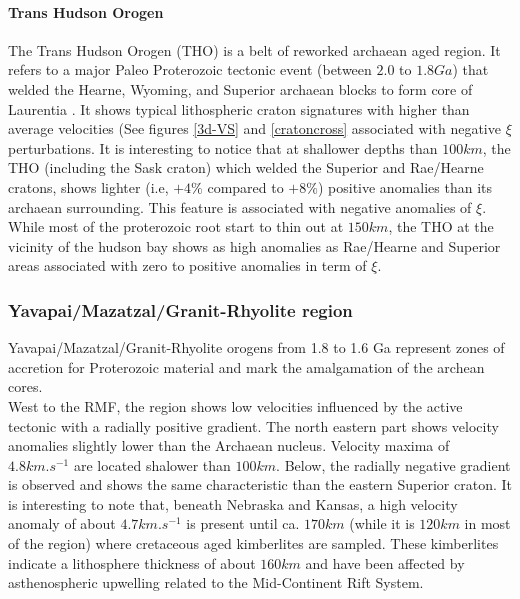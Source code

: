 \documentclass[12pt]{article}
\begin{document}
		\paragraph{Trans Hudson Orogen}
			The Trans Hudson Orogen (THO) is a belt of reworked archaean aged region. It refers to a major Paleo Proterozoic tectonic event (between $2.0$ to $1.8Ga$) that welded the Hearne, Wyoming, and Superior archaean blocks to form core of Laurentia \citep{hoffman1988united,whitmeyer2007tectonic}.
			It shows typical lithospheric craton signatures with higher than average velocities (See figures \ref{3d-VS} and \ref{cratoncross} associated with negative $\xi$ perturbations. 
			It is interesting to notice that at shallower depths than $100km$, the THO (including the Sask craton) which welded the Superior and Rae/Hearne cratons, shows lighter (i.e, $+4\%$ compared to $+8\%$) positive anomalies than its archaean surrounding. This feature is associated with negative anomalies of $\xi$. While most of the proterozoic root start to thin out at $150km$, the THO at the vicinity of the hudson bay shows as high anomalies as Rae/Hearne and Superior areas associated with zero to positive anomalies in term of $\xi$. 
			
	\subsubsection{Yavapai/Mazatzal/Granit-Rhyolite region}

		Yavapai/Mazatzal/Granit-Rhyolite orogens from 1.8 to 1.6 Ga represent zones of accretion for Proterozoic material and mark the amalgamation of the archean cores. \citep{hoffman1988united} \\
		West to the RMF, the region shows low velocities influenced by the active tectonic with a radially positive gradient. 
		The north eastern part shows velocity anomalies slightly lower than the Archaean nucleus. Velocity maxima of $4.8km.s^{-1}$ are located shalower than $100km$. 
		Below, the radially negative gradient is observed and shows the same characteristic than the eastern Superior craton. It is interesting to note that, beneath Nebraska and Kansas, a high velocity anomaly of about $4.7km.s^{-1}$ is present until ca. $170km$ (while it is $120km$ in most of the region) where cretaceous aged kimberlites are sampled. 
		These kimberlites indicate a lithosphere thickness of about $160km$ and have been affected by asthenospheric upwelling related to the Mid-Continent Rift System. \citep{griffin2004lithosphere}
\end{document}
